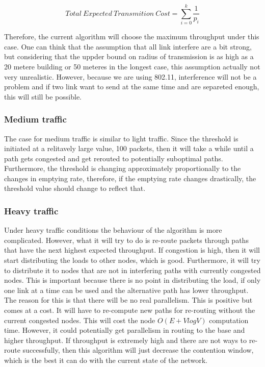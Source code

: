 \documentclass[letterpaper]{article}
\begin{document}
$$  Total \ Expected \ Transmition \ Cost = \sum_{i=0}^{k}\frac{1}{p_{i}}$$

Therefore, the current algorithm will choose the maximum throughput under this case. One can think that the assumption that all link interfere are a bit strong, but considering that the uppder bound on radius of transmission is as high as a 20 metere building or 50 meteres in the longest case, this assumption actually not very unrealistic. However, because we are using 802.11, interference will not be a problem and if two link want to send at the same time and are separeted enough, this will still be possible.

\subsubsection{Medium traffic}

The case for medium traffic is similar to light traffic. Since the threshold is initiated at a relitavely large value, 100 packets, then it will take a while until a path gets congested and get rerouted to potentially suboptimal paths. Furthermore, the threshold is changing approximately proportionally to the changes in emptying rate, therefore, if the emptying rate changes drastically, the threshold value should change to reflect that.

\subsubsection{Heavy traffic}

Under heavy traffic conditions the behaviour of the algorithm is more complicated. However, what it will try to do is re-route packets through paths that have the next highest expected throughput. If congestion is high, then it will start distributing the loads to other nodes, which is good. Furthermore, it will try to distribute it to nodes that are not in interfering paths with currently congested nodes. This is important because there is no point in distributing the load, if only one link at a time can be used and the alternative path has lower throughput. The reason for this is that there will be no real parallelism. This is positive but comes at a cost. It will have to re-compute new paths for re-routing without the current congested nodes. This will cost the node $O(E + VlogV)$ computation time. However, it could potentially get parallelism in routing to the base and higher throughput. If throughput is extremely high and there are not ways to re-route successfully, then this algorithm will just decrease the contention window, which is the best it can do with the current state of the network.
\end{document}
